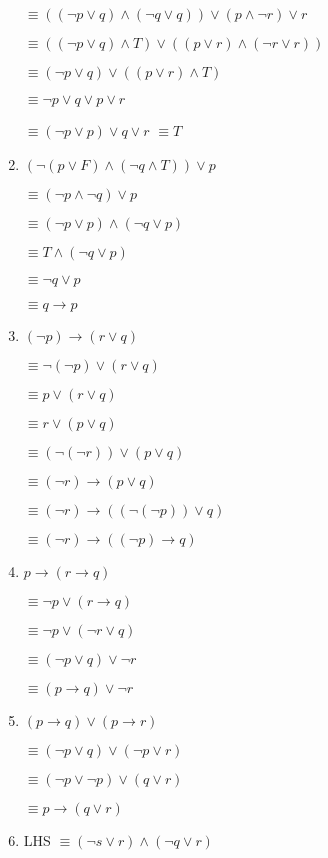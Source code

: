 \documentclass{sig-alternate-05-2015}
\begin{document}
\begin{enumerate}
$\equiv ((\neg p\vee q)\wedge (\neg q\vee q) ) \vee (p \wedge \neg r) \vee r$

$\equiv ((\neg p\vee q)\wedge T) \vee ((p \vee r) \wedge (\neg r \vee r)) $

$\equiv (\neg p\vee q) \vee ((p \vee r) \wedge T) $

$\equiv \neg p\vee q \vee p \vee r $

$\equiv (\neg p \vee p)\vee q \vee r $
$\equiv T $
\item  $(\neg(p \vee F) \wedge (\neg q \wedge T)) \vee p$

$\equiv (\neg p \wedge \neg q)\vee p$

$\equiv (\neg p\vee p) \wedge (\neg q \vee p)$

 $\equiv T \wedge (\neg q \vee p)$

 $\equiv \neg q \vee p$
  
  $\equiv  q \rightarrow p$
 
 \item $ (\neg p) \rightarrow (r\vee q)$
 
 $\equiv  \neg(\neg p) \vee (r\vee q)$

$\equiv  p \vee (r\vee q)$

$\equiv  r \vee (p\vee q)$

$\equiv  (\neg(\neg r)) \vee (p\vee q)$

$\equiv  (\neg r)\rightarrow (p\vee q)$

$\equiv  (\neg r)\rightarrow ((\neg(\neg p))\vee q)$

$\equiv  (\neg r)\rightarrow ((\neg p)\rightarrow q)$

\item $p \rightarrow (r \rightarrow q)$

$\equiv \neg p \vee  (r \rightarrow q)$

$\equiv \neg p \vee  (\neg r \vee q)$

$\equiv (\neg p \vee   q) \vee \neg r$

$\equiv ( p \rightarrow q) \vee \neg r$

\item  $(p \rightarrow q) \vee (p \rightarrow r)$

$\equiv (\neg p \vee q) \vee (\neg p \vee r)$

$\equiv (\neg p \vee \neg p) \vee ( q \vee r)$

$\equiv  p \rightarrow ( q \vee r)$

\item LHS $\equiv (\neg s \vee r) \wedge (\neg q \vee r)$


\end{enumerate}
\end{document}
